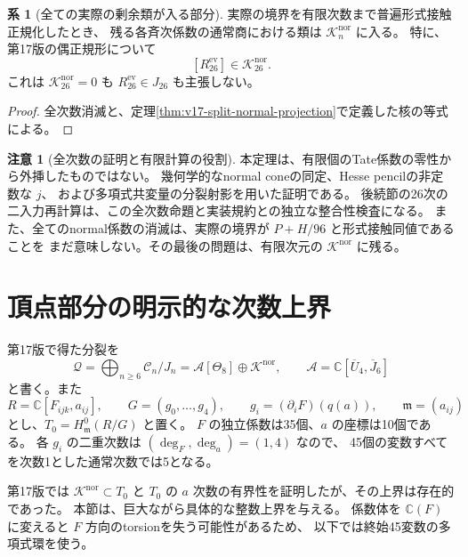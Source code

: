 \documentclass[a4paper,11pt]{ltjsarticle}
\theoremstyle{definition}
\newtheorem{remark}[theorem]{注意}
\newtheorem{corollary}[theorem]{系}
\newcommand{\CC}{\mathbb C}
\begin{document}
\begin{corollary}[全ての実際の剰余類が入る部分]
\label{cor:v18-all-actual-classes-vertex}
実際の境界を有限次数まで普遍形式接触正規化したとき、
残る各斉次係数の通常商における類は $\mathcal K_n^{\mathrm{nor}}$ に入る。
特に、第17版の偶正規形について
\[
 [R_{26}^{\mathrm{ev}}]\in\mathcal K_{26}^{\mathrm{nor}}.
\]
これは $\mathcal K_{26}^{\mathrm{nor}}=0$ も $R_{26}^{\mathrm{ev}}\in J_{26}$ も主張しない。
\end{corollary}

\begin{proof}
全次数消滅と、定理\ref{thm:v17-split-normal-projection}で定義した核の等式による。
\end{proof}

\begin{remark}[全次数の証明と有限計算の役割]
本定理は、有限個のTate係数の零性から外挿したものではない。
幾何学的なnormal coneの同定、Hesse pencilの非定数な $j$、
および多項式共変量の分裂射影を用いた証明である。
後続節の26次の二入力再計算は、この全次数命題と実装規約との独立な整合性検査になる。
また、全てのnormal係数の消滅は、実際の境界が $P+H/96$ と形式接触同値であることを
まだ意味しない。その最後の問題は、有限次元の $\mathcal K^{\mathrm{nor}}$ に残る。
\end{remark}




\section{頂点部分の明示的な次数上界}
\label{sec:v18-effective-vertex-bound}

第17版で得た分裂を
\[
 \mathcal Q=\bigoplus_{n\ge6}\mathcal C_n/J_n
 =\mathcal A[\Theta_8]\oplus\mathcal K^{\mathrm{nor}},
 \qquad \mathcal A=\CC[\overline U_4,\overline J_6]
\]
と書く。また
\[
 R=\CC[F_{ijk},a_{ij}],\qquad
 G=(g_0,\ldots,g_4),\qquad g_i=(\partial_iF)(q(a)),
 \qquad\mathfrak m=(a_{ij})
\]
とし、$T_0=H^0_{\mathfrak m}(R/G)$ と置く。
$F$ の独立係数は35個、$a$ の座標は10個である。
各 $g_i$ の二重次数は $(\deg_F,\deg_a)=(1,4)$ なので、
45個の変数すべてを次数1とした通常次数では5となる。

第17版では $\mathcal K^{\mathrm{nor}}\subset T_0$ と
$T_0$ の $a$ 次数の有界性を証明したが、その上界は存在的であった。
本節は、巨大ながら具体的な整数上界を与える。
係数体を $\CC(F)$ に変えると $F$ 方向のtorsionを失う可能性があるため、
以下では終始45変数の多項式環を使う。
\end{document}
